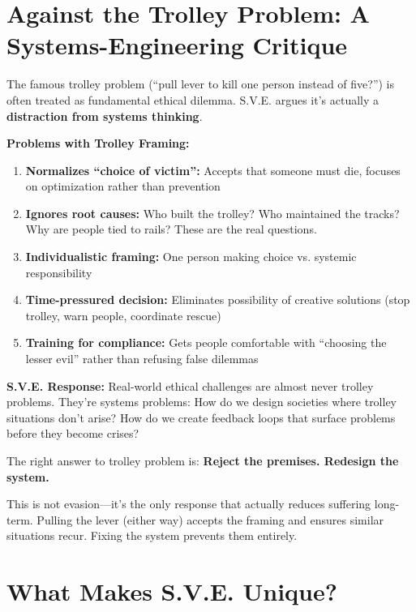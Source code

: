\documentclass[11pt,a4paper]{article}
\theoremstyle{definition}
\theoremstyle{remark}
\begin{document}
\section{Against the Trolley Problem: A Systems-Engineering Critique}
\label{subsec:trolley}

The famous trolley problem (``pull lever to kill one person instead of five?'') is often treated as fundamental ethical dilemma. S.V.E. argues it's actually a \textbf{distraction from systems thinking}.

\textbf{Problems with Trolley Framing:}
\begin{enumerate}
    \item \textbf{Normalizes ``choice of victim'':} Accepts that someone must die, focuses on optimization rather than prevention
    
    \item \textbf{Ignores root causes:} Who built the trolley? Who maintained the tracks? Why are people tied to rails? These are the real questions.
    
    \item \textbf{Individualistic framing:} One person making choice vs. systemic responsibility
    
    \item \textbf{Time-pressured decision:} Eliminates possibility of creative solutions (stop trolley, warn people, coordinate rescue)
    
    \item \textbf{Training for compliance:} Gets people comfortable with ``choosing the lesser evil'' rather than refusing false dilemmas
\end{enumerate}

\textbf{S.V.E. Response:}
Real-world ethical challenges are almost never trolley problems. They're systems problems: How do we design societies where trolley situations don't arise? How do we create feedback loops that surface problems before they become crises?

The right answer to trolley problem is: \textbf{Reject the premises. Redesign the system.}

This is not evasion---it's the only response that actually reduces suffering long-term. Pulling the lever (either way) accepts the framing and ensures similar situations recur. Fixing the system prevents them entirely.

\section{What Makes S.V.E. Unique?}
\label{subsec:sve_unique}
\end{document}
